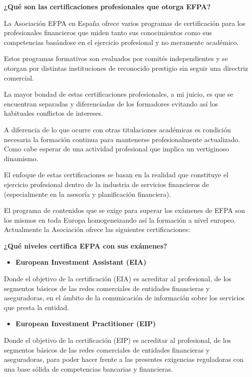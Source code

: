 \documentclass[
  letterpaper,
  DIV=11,
  numbers=noendperiod]{scrreprt}
\begin{document}
\textbf{¿Qué son las certificaciones profesionales que otorga EFPA?}

La Asociación EFPA en España ofrece varios programas de certificación
para los profesionales financieros que miden tanto sus conocimientos
como sus competencias basándose en el ejercicio profesional y no
meramente académico.

Estos programas formativos son evaluados por comités independientes y se
otorgan por distintas instituciones de reconocido prestigio sin seguir
una directriz comercial.

La mayor bondad de estas certificaciones profesionales, a mi juicio, es
que se encuentran separadas y diferenciadas de los formadores evitando
así los habituales conflictos de intereses.

A diferencia de lo que ocurre con otras titulaciones académicas es
condición necesaria la formación continua para mantenerse
profesionalmente actualizado. Como cabe esperar de una actividad
profesional que implica un vertiginoso dinamismo.

El enfoque de estas certificaciones se basan en la realidad que
constituye el ejercicio profesional dentro de la industria de servicios
financieros de (especialmente en la asesoría y planificación
financiera).

El programa de contenidos que se exige para superar los exámenes de EFPA
son los mismos en toda Europa homogeneizando así la formación a nivel
europeo. Actualmente la Asociación ofrece las siguientes
certificaciones:

\textbf{¿Qué niveles certifica EFPA con sus exámenes?}

\begin{itemize}
\item
  \textbf{European Investment Assistant (EIA)}
\end{itemize}

Donde el objetivo de la certificación (EIA) es acreditar al profesional,
de los segmentos básicos de las redes comerciales de entidades
financieras y aseguradoras, en el ámbito de la comunicación de
información sobre los servicios que presta la entidad.

\begin{itemize}
\item
  \textbf{European Investment Practitioner (EIP)}
\end{itemize}

Donde el objetivo de la certificación (EIP) es acreditar al profesional,
de los segmentos básicos de las redes comerciales de entidades
financieras y aseguradoras, para poder hacer frente a las presentes
exigencias reguladoras con una base sólida de competencias bancarias y
financieras.
\end{document}
